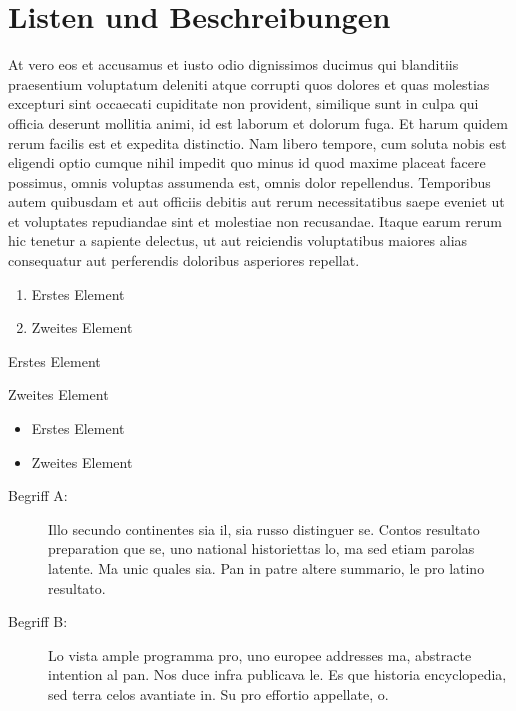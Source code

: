 \section{Listen und Beschreibungen}

At vero eos et accusamus et iusto odio dignissimos ducimus qui blanditiis praesentium voluptatum deleniti atque corrupti quos dolores et quas molestias excepturi sint occaecati cupiditate non provident, similique sunt in culpa qui officia deserunt mollitia animi, id est laborum et dolorum fuga. Et harum quidem rerum facilis est et expedita distinctio. Nam libero tempore, cum soluta nobis est eligendi optio cumque nihil impedit quo minus id quod maxime placeat facere possimus, omnis voluptas assumenda est, omnis dolor repellendus. Temporibus autem quibusdam et aut officiis debitis aut rerum necessitatibus saepe eveniet ut et voluptates repudiandae sint et molestiae non recusandae. Itaque earum rerum hic tenetur a sapiente delectus, ut aut reiciendis voluptatibus maiores alias consequatur aut perferendis doloribus asperiores repellat.

\begin{enumerate}
    \item Erstes Element
    \item Zweites Element 
\end{enumerate}

\begin{aenumerate}
    \item Erstes Element
    \item Zweites Element
\end{aenumerate}

\begin{itemize}
    \item Erstes Element
    \item Zweites Element
\end{itemize}

\begin{description}
	\item[Begriff A:] Illo secundo continentes sia il, sia russo distinguer se. Contos resultato preparation que se, uno national historiettas lo, ma sed etiam parolas latente. Ma unic quales sia. Pan in patre altere summario, le pro latino resultato.
    \item[Begriff B:] Lo vista ample programma pro, uno europee addresses ma, abstracte intention al pan. Nos duce infra publicava le. Es que historia encyclopedia, sed terra celos avantiate in. Su pro effortio appellate, o.
\end{description}


